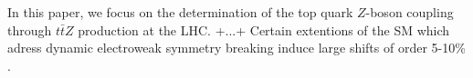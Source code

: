 \documentclass[preprint]{JHEP3} %
\def\ttbZ{t\bar{t}Z}
\def\ttb{t\bar{t}}
\begin{document}


In this paper, we focus on the determination of the top quark $Z$-boson coupling through $\ttbZ$ production at the LHC. +...+
Certain extentions of the SM which adress dynamic electroweak symmetry breaking induce large shifts of order 5-10\% \cite{?}.
% 
\end{document}
